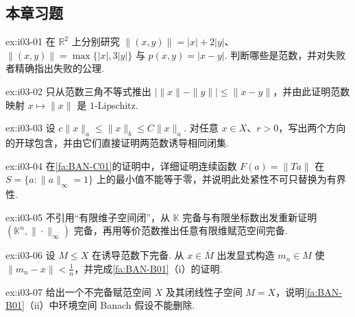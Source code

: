 \subsection{本章习题}\label{sec:i03-exercises}

\begin{FAExercise}[范数公理核验]{ex:i03-01}
在 \(\displaystyle \mathbb R^2\) 上分别研究 \(\displaystyle \|(x,y)\|=|x|+2|y|\)、\(\displaystyle \|(x,y)\|=\max\{|x|,3|y|\}\) 与 \(\displaystyle p(x,y)=|x-y|\). 判断哪些是范数，并对失败者精确指出失败的公理.
\end{FAExercise}

\begin{FAExercise}[反三角不等式]{ex:i03-02}
只从范数三角不等式推出 \(\displaystyle |\|x\|-\|y\||\leqslant\|x-y\|\)，并由此证明范数映射 \(\displaystyle x\mapsto\|x\|\) 是 \(\displaystyle1\)-Lipschitz.
\end{FAExercise}

\begin{FAExercise}[等价范数的定量球包含]{ex:i03-03}
设 \(\displaystyle c\|x\|_a\leqslant\|x\|_b\leqslant C\|x\|_a\). 对任意 \(\displaystyle x\in X\)、\(\displaystyle r>0\)，写出两个方向的开球包含，并由它们直接证明两范数诱导相同闭集.
\end{FAExercise}

\begin{FAExercise}[有限维范数等价中的正下界]{ex:i03-04}
在\autoref{fa:BAN-C01}的证明中，详细证明连续函数 \(\displaystyle F(a)=\|Ta\|\) 在 \(\displaystyle S=\{a:\|a\|_\infty=1\}\) 上的最小值不能等于零，并说明此处紧性不可只替换为有界性.
\end{FAExercise}

\begin{FAExercise}[有限维完备性的坐标证明]{ex:i03-05}
不引用“有限维子空间闭”，从 \(\displaystyle \mathbb K\) 完备与有限坐标数出发重新证明 \(\displaystyle (\mathbb K^n,\|\cdot\|_\infty)\) 完备，再用等价范数推出任意有限维赋范空间完备.
\end{FAExercise}

\begin{FAExercise}[完备子空间必闭]{ex:i03-06}
设 \(\displaystyle M\leqslant X\) 在诱导范数下完备. 从 \(\displaystyle x\in\overline M\) 出发显式构造 \(\displaystyle m_n\in M\) 使 \(\displaystyle \|m_n-x\|<\frac{1}{n}\)，并完成\autoref{fa:BAN-B01}（i）的证明.
\end{FAExercise}

\begin{FAExercise}[闭子空间的环境完备性]{ex:i03-07}
给出一个不完备赋范空间 \(\displaystyle X\) 及其闭线性子空间 \(\displaystyle M=X\)，说明\autoref{fa:BAN-B01}（ii）中环境空间 Banach 假设不能删除.
\end{FAExercise}

